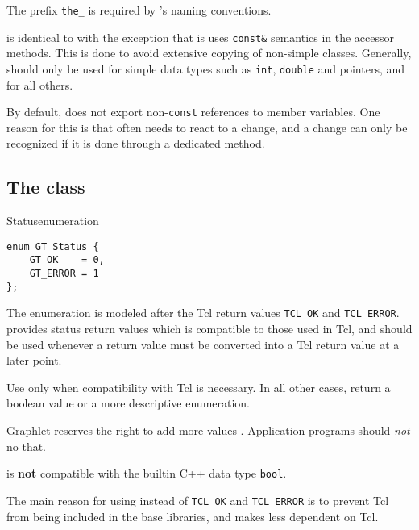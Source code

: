 \documentclass[twoside,fleqn]{report}
\begin{document}
\begin{notes}

  \item The prefix \texttt{the\_} is required by \Graphlet{}'s naming 
  conventions.
  
  \item {} is identical to  with
  the exception that is uses \texttt{const\&} semantics in the
  accessor methods.  This is done to avoid extensive copying of
  non-simple classes.  Generally,  should only be
  used for simple data types such as \texttt{int},
  \texttt{double} and pointers, and  for
  all others.
  
  \item By default, \Graphlet{} does not export
  non-\texttt{const} references to member variables.  One reason
  for this is that \Graphlet{} often needs to react to a change,
  and a change can only be recognized if it is done through a
  dedicated method.
  
\end{notes}



%
%

\subsection{The class }

\begin{Cdeclaration}{Status}{enumeration }
\begin{verbatim}
enum GT_Status {
    GT_OK    = 0,
    GT_ERROR = 1
};
\end{verbatim}
\end{Cdeclaration}

\noindent The enumeration  is modeled after the Tcl return
values \texttt{TCL\_OK} and \texttt{TCL\_ERROR}.  
provides status return values which is compatible to those used
in Tcl, and should be used whenever a return value must be
converted into a Tcl return value at a later point.

\begin{notes}

  \item Use  only when compatibility with Tcl is necessary.  
  In all other cases, return a boolean value or a more descriptive 
  enumeration.
  
  \item Graphlet reserves the right to add more values
  . Application programs should \emph{not} no that.
  
  \item {} is \textbf{not} compatible with the builtin
  C++ data type \texttt{bool}.

  \item The main reason for using  instead of
  \texttt{TCL\_OK} and \texttt{TCL\_ERROR} is to prevent Tcl from
  being included in the \Graphlet{} base libraries, and makes
  \Graphlet{} less dependent on Tcl.

\end{notes}
\end{document}
